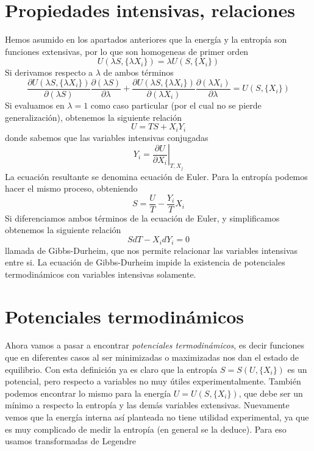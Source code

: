 \section{Propiedades intensivas, relaciones}
Hemos asumido en los apartados anteriores que la energía y la entropía son funciones extensivas, por lo que son homogeneas de primer orden
\[ U(\lambda S, \{\lambda X_i \}) = \lambda U(S,\{X_i\}) \]
Si derivamos respecto a $\lambda$ de ambos términos
\[ \frac{\partial U(\lambda S, \{\lambda X_i\})}{\partial (\lambda S)} \frac{\partial (\lambda S)}{\partial \lambda} + \frac{\partial U(\lambda S, \{\lambda X_i\})}{\partial (\lambda X_i)} \frac{\partial (\lambda X_i)}{\partial \lambda} = U(S,\{X_i\})\]
Si evaluamos en $\lambda = 1$ como caso particular (por el cual no se pierde generalización), obtenemos la siguiente relación
\begin{equation}
U = T S + X_i Y_i
\label{eq:euler}
\end{equation}
donde sabemos que las variables intensivas conjugadas
\begin{equation}
Y_i = \left.\frac{\partial U}{\partial X_i}\right|_{T,X_j}
\end{equation}
La ecuación resultante se denomina ecuación de Euler.
Para la entropía podemos hacer el mismo proceso, obteniendo
\begin{equation}
S = \frac{U}{T} - \frac{Y_i}{T} X_i
\label{eq:euler_entropia}
\end{equation}
Si diferenciamos ambos términos de la ecuación de Euler, y simplificamos obtenemos la siguiente relación
\begin{equation}
S dT - X_i dY_i = 0
\label{eq:gibbs_durheim}
\end{equation}
llamada de Gibbs-Durheim, que nos permite relacionar las variables intensivas entre si.
La ecuación de Gibbs-Durheim impide la existencia de potenciales termodinámicos con variables intensivas solamente.
\section{Potenciales termodinámicos}
Ahora vamos a pasar a encontrar \emph{potenciales termodinámicos}, es decir funciones que en diferentes casos al ser minimizadas o maximizadas nos dan el estado de equilibrio.
Con esta definición ya es claro que la entropía $S = S(U,\{X_i\})$ es un potencial, pero respecto a variables no muy útiles experimentalmente.
También podemos encontrar lo mismo para la energía $U = U(S,\{X_i\})$, que debe ser un mínimo a respecto la entropía y las demás variables extensivas.
Nuevamente vemos que la energía interna así planteada no tiene utilidad experimental, ya que es muy complicado de medir la entropía (en general se la deduce).
Para eso usamos transformadas de Legendre
